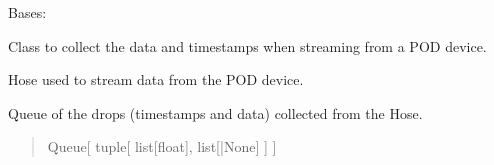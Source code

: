 \documentclass[letterpaper,10pt,english]{sphinxmanual}
\begin{document}
\begin{fulllineitems}
\label{\detokenize{PodApi.Stream:PodApi.Stream.DataBucket.Bucket}}
\pysigstartsignatures
{}
\pysigstopsignatures
\sphinxAtStartPar
Bases: 

\sphinxAtStartPar
Class to collect the data and timestamps when streaming from a POD device.

\begin{fulllineitems}
\label{\detokenize{PodApi.Stream:PodApi.Stream.DataBucket.Bucket.dataHose}}
\pysigstartsignatures
{}
\pysigstopsignatures
\sphinxAtStartPar
Hose used to stream data from the POD device.
\begin{quote}\begin{description}
\sphinxAtStartPar
{\hyperref[\detokenize{PodApi.Stream:PodApi.Stream.DataHose.Hose}]{}}

\end{description}\end{quote}

\end{fulllineitems}


\begin{fulllineitems}
\label{\detokenize{PodApi.Stream:PodApi.Stream.DataBucket.Bucket.drops}}
\pysigstartsignatures
{}
\pysigstopsignatures
\sphinxAtStartPar
Queue of the drops             (timestamps and data) collected from the Hose.
\begin{quote}\begin{description}
\sphinxAtStartPar
Queue{[} tuple{[} list{[}float{]}, list{[}{\hyperref[\detokenize{PodApi.Packets:PodApi.Packets.Packet.Packet}]{}}|None{]} {]} {]}


\end{description}
\end{quote}
\end{fulllineitems}
\end{fulllineitems}
\end{document}
